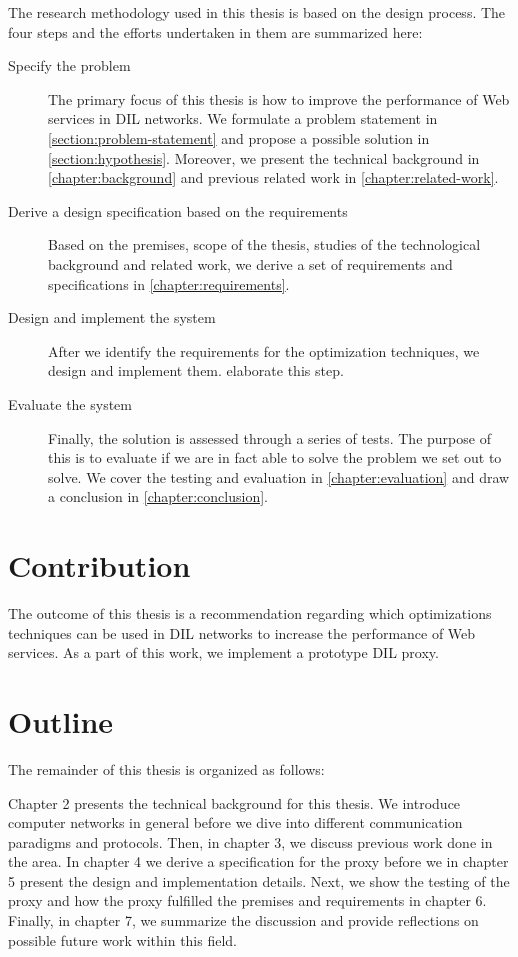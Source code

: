 The research methodology used in this thesis is based on the design process. The
four steps and the efforts undertaken in them are summarized here:

\begin{description}

    \item[Specify the problem] The primary focus of this thesis is how to improve
    the performance of Web services in DIL networks. We formulate a problem
    statement in \cref{section:problem-statement} and propose a possible
    solution in \cref{section:hypothesis}. Moreover, we present the technical
    background in \cref{chapter:background} and previous related work in
    \cref{chapter:related-work}.

    \item[Derive a design specification based on the requirements] Based on the
    premises, scope of the thesis, studies of the technological background and
    related work, we derive a set of requirements and specifications in
    \cref{chapter:requirements}.

    \item[Design and implement the system] After we identify the requirements
    for the optimization techniques, we design and implement them.
     elaborate this step.

    \item[Evaluate the system] Finally, the solution is assessed through a
    series of tests. The purpose of this is to evaluate if we are in fact able
    to solve the problem we set out to solve. We cover the testing and
    evaluation in \cref{chapter:evaluation} and draw a conclusion in
    \cref{chapter:conclusion}.

\end{description}


\section{Contribution}

The outcome of this thesis is a recommendation regarding which optimizations
techniques can be used in DIL networks to increase the performance of Web
services. As a part of this work, we implement a prototype DIL proxy.

\section{Outline}

The remainder of this thesis is organized as follows:

Chapter 2 presents the technical background for this thesis. We introduce
computer networks in general before we dive into different communication
paradigms and protocols. Then, in chapter 3, we discuss previous work done in
the area. In chapter 4 we derive a specification for the proxy before we in
chapter 5 present the design and implementation details. Next, we show the
testing of the proxy and how the proxy fulfilled the premises and requirements
in chapter 6. Finally, in chapter 7, we summarize the discussion and provide
reflections on possible future work within this field.
